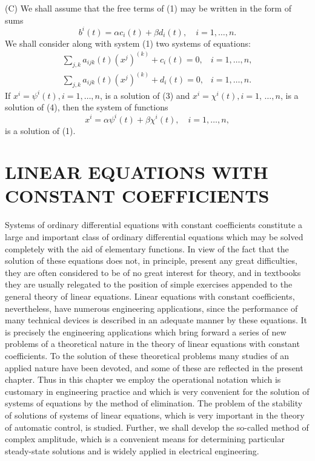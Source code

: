 \documentclass[10pt,a5paper]{book}
\theoremstyle{plain}
\theoremstyle{definition}
\theoremstyle{remark}
\begin{document}
(C) We shall assume that the free terms of (1) may be written in the form of sums
\[
b^{i}(t)=\alpha c_{i}(t)+\beta d_{i}(t), \quad i=1, \ldots, n .
\]
We shall consider along with system (1) two systems of equations:
\[
\begin{array}{ll}
\sum_{j, k} a_{i j k}(t)\left(x^{j}\right)^{(k)}+c_{i}(t)=0, & i=1, \ldots, n, \\
\sum_{j, k} a_{i j k}(t)\left(x^{j}\right)^{(k)}+d_{i}(t)=0, & i=1, \ldots, n . \tag{4}
\end{array}
\]
If $x^{i}=\psi^{i}(t), i=1, \ldots, n$, is a solution of (3) and $x^{i}=\chi^{i}(t), i=1$, $\ldots, n$, is a solution of (4), then the system of functions
\[
x^{i}=\alpha \psi^{i}(t)+\beta \chi^{i}(t), \quad i=1, \ldots, n,
\]
is a solution of (1).

\chapter{LINEAR EQUATIONS WITH CONSTANT COEFFICIENTS}
Systems of ordinary differential equations with constant coefficients constitute a large and important class of ordinary differential equations which may be solved completely with the aid of elementary functions. In view of the fact that the solution of these equations does not, in principle, present any great difficulties, they are often considered to be of no great interest for theory, and in textbooks they are usually relegated to the position of simple exercises appended to the general theory of linear equations. Linear equations with constant coefficients, nevertheless, have numerous engineering applications, since the performance of many technical devices is described in an adequate manner by these equations. It is precisely the engineering applications which bring forward a series of new problems of a theoretical nature in the theory of linear equations with constant coefficients. To the solution of these theoretical problems many studies of an applied nature have been devoted, and some of these are reflected in the present chapter. Thus in this chapter we employ the operational notation which is customary in engineering practice and which is very convenient for the solution of systems of equations by the method of elimination. The problem of the stability of solutions of systems of linear equations, which is very important in the theory of automatic control, is studied. Further, we shall develop the so-called method of complex amplitude, which is a convenient means for determining particular steady-state solutions and is widely applied in electrical engineering.
\end{document}
